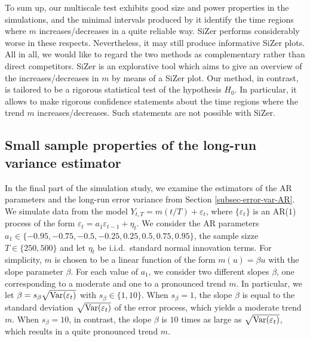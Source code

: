To sum up, our multiscale test exhibits good size and power properties in the simulations, and the minimal intervals produced by it identify the time regions where $m$ increases/decreases in a quite reliable way. SiZer performs considerably worse in these respects. Nevertheless, it may still produce informative SiZer plots. %
All in all, we would like to regard the two methods as complementary rather than direct competitors. SiZer is an explorative tool which aims to give an overview of the increases/decreases in $m$ by means of a SiZer plot. Our method, in contrast, is tailored to be a rigorous statistical test of the hypothesis $H_0$. In particular, it allows to make rigorous confidence statements about the time regions where the trend $m$ increases/decreases. Such statements are not possible with SiZer. 


\subsection{Small sample properties of the long-run variance estimator}\label{subsec-sim-3}


In the final part of the simulation study, we examine the estimators of the AR parameters and the long-run error variance from Section \ref{subsec-error-var-AR}. We simulate data from the model $Y_{t,T} = m(t/T) + \varepsilon_t$, where $\{ \varepsilon_t\}$ is an AR($1$) process of the form $\varepsilon_t = a_1 \varepsilon_{t-1} + \eta_t$. We consider the AR parameters $a_1 \in \{-0.95,-0.75,-0.5,-0.25,0.25,0.5,0.75,0.95\}$, the sample sizze $T \in \{250, 500\}$ and let $\eta_t$ be i.i.d.\ standard normal innovation terms. For simplicity, $m$ is chosen to be a linear function of the form $m(u) = \beta u$ with the slope parameter $\beta$. For each value of $a_1$, we consider two different slopes $\beta$, one corresponding to a moderate and one to a pronounced trend $m$. 
In particular, we let $\beta = s_\beta \sqrt{\textnormal{Var}(\varepsilon_t)}$ with $s_\beta \in \{1,10\}$. When $s_\beta = 1$, the slope $\beta$ is equal to the standard deviation $\sqrt{\textnormal{Var}(\varepsilon_t)}$ of the error process, which yields a moderate trend $m$. When $s_\beta = 10$, in contrast, the slope $\beta$ is $10$ times as large as $\sqrt{\textnormal{Var}(\varepsilon_t)}$, which results in a quite pronounced trend $m$. 

